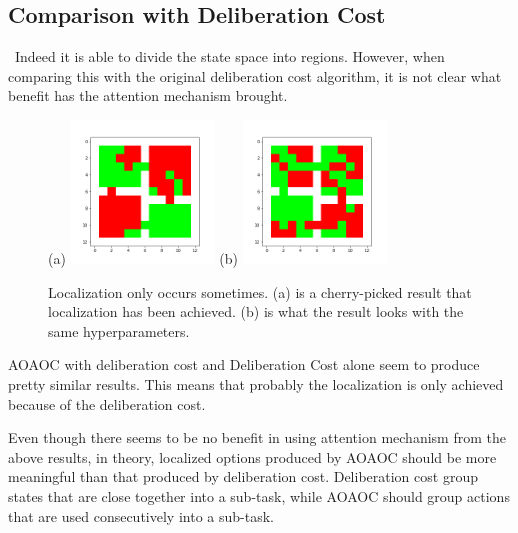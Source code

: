 \documentclass{article}
\begin{document}
	\subsection*{Comparison with Deliberation Cost}
	\qquad \ Indeed it is able to divide the state space into regions. However, when comparing this with the original deliberation cost algorithm, it is not clear what benefit has the attention mechanism brought. 
	\begin{figure}[h]
		\centering
		\large{(a)}
		\includegraphics[width=1.5in]{cherryPicked.png}
		\hspace{0.2in}
		\large{(b)}
		\includegraphics[width=1.5in]{nonPicked.png}
		\caption{Localization only occurs sometimes. (a) is a cherry-picked result that localization has been achieved. (b) is what the result looks with the same hyperparameters.}
	\end{figure}

	\quad AOAOC with deliberation cost and Deliberation Cost alone seem to produce pretty similar results. This means that probably the localization is only achieved because of the deliberation cost.
	
	\quad Even though there seems to be no benefit in using attention mechanism from the above results, in theory, localized options produced by AOAOC should be more meaningful than that produced by deliberation cost. Deliberation cost group states that are close together into a sub-task, while AOAOC should group actions that are used consecutively into a sub-task.
	
\end{document}
